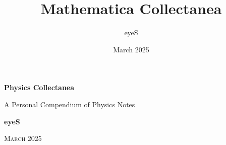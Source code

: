 \documentclass[oneside]{book}
\title{Mathematica Collectanea}
\author{eyeS}
\date{March 2025}
\begin{document}
\begin{titlepage}
    \centering
    \vspace*{3cm}
    {\Huge \bfseries Physics Collectanea \par}
    \vspace{0.5cm}
    {\large A Personal Compendium of Physics Notes\par}
    \vfill
    {\LARGE \bfseries eyeS\par}
    \vspace{0.5cm}
    {\Large \textsc{March 2025}}
\end{titlepage}

\tableofcontents
\clearpage



\end{document}
